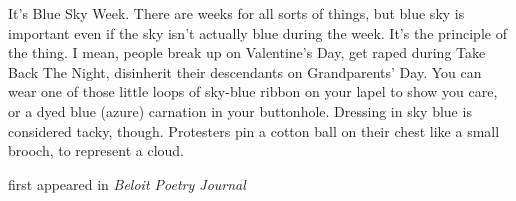 It's Blue Sky Week. There are weeks for all sorts of things, but blue
sky is important even if the sky isn't actually blue during the week.
It's the principle of the thing. I mean, people break up on Valentine's
Day, get raped during Take Back The Night, disinherit their descendants
on Grandparents' Day. You can wear one of those little loops of sky-blue
ribbon on your lapel to show you care, or a dyed blue (azure) carnation
in your buttonhole. Dressing in sky blue is considered tacky, though.
Protesters pin a cotton ball on their chest like a small brooch, to
represent a cloud.

first appeared in \emph{Beloit Poetry Journal}
